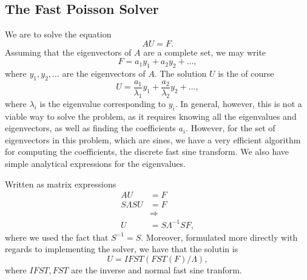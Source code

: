 \subsection{The Fast Poisson Solver}
We are to solve the equation
$$
A U = F.
$$
Assuming that the eigenvectors of $A$ are a complete set, we may write
$$
F = a_1 y_1 + a_2 y_2 + ...,
$$
where $y_1, y_2, \dots$ are the eigenvectors of $A$.
The solution $U$ is the of course
$$
U =
\frac{a_1}{\lambda_1} y_1
+ \frac{a_2}{\lambda_2} y_2
+ \dots,
$$
where $\lambda_i$ is the eigenvalue corresponding to $y_i$.
In general, however, this is not a viable way to solve the problem, as it requires knowing all the eigenvalues and eigenvectors, as well as finding the coefficients $a_i$.
However, for the set of eigenvectors in this problem, which are sines, we have a very efficient algorithm for computing the coefficients, the discrete fast sine transform.
We also have simple analytical expressions for the eigenvalues.

Written as matrix expressions
\begin{align}
  A U &= F\\
  S\Lambda S U &= F\\
  &\Rightarrow\\
  U &= S\Lambda^{-1} S F,
\end{align}
where we used the fact that $S^{-1} = S$.
Moreover, formulated more directly with regards to implementing the solver, we have that the solutin is
$$
U = IFST(FST(F) / \Lambda),
$$
where $IFST, FST$ are the inverse and normal fast sine tranform.
